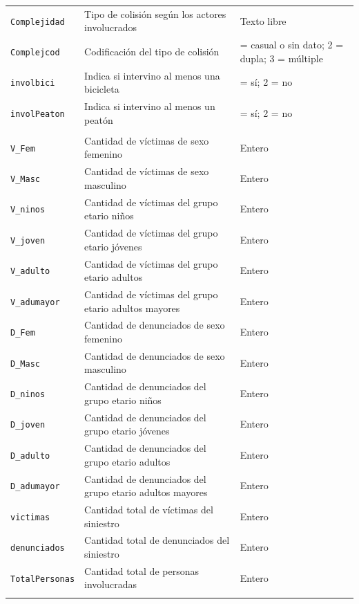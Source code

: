 \begin{longtable}{@{}>{\raggedright\arraybackslash}p{}
                    >{\raggedright\arraybackslash}p{}
                    >{\raggedright\arraybackslash}p{}@{}}
\texttt{Complejidad} & Tipo de colisión según los actores involucrados & Texto libre \\
\texttt{Complejcod} & Codificación del tipo de colisión & 1 = casual o sin dato; 2 = dupla; 3 = múltiple \\
\texttt{involbici} & Indica si intervino al menos una bicicleta & 1 = sí; 2 = no \\
\texttt{involPeaton} & Indica si intervino al menos un peatón & 1 = sí; 2 = no \\
\addlinespace

\multicolumn{3}{@{}l}{\textit{Personas involucradas}} \\
\addlinespace
\texttt{V\_Fem} & Cantidad de víctimas de sexo femenino & Entero \\
\texttt{V\_Masc} & Cantidad de víctimas de sexo masculino & Entero \\
\texttt{V\_ninos} & Cantidad de víctimas del grupo etario niños & Entero \\
\texttt{V\_joven} & Cantidad de víctimas del grupo etario jóvenes & Entero \\
\texttt{V\_adulto} & Cantidad de víctimas del grupo etario adultos & Entero \\
\texttt{V\_adumayor} & Cantidad de víctimas del grupo etario adultos mayores & Entero \\
\texttt{D\_Fem} & Cantidad de denunciados de sexo femenino & Entero \\
\texttt{D\_Masc} & Cantidad de denunciados de sexo masculino & Entero \\
\texttt{D\_ninos} & Cantidad de denunciados del grupo etario niños & Entero \\
\texttt{D\_joven} & Cantidad de denunciados del grupo etario jóvenes & Entero \\
\texttt{D\_adulto} & Cantidad de denunciados del grupo etario adultos & Entero \\
\texttt{D\_adumayor} & Cantidad de denunciados del grupo etario adultos mayores & Entero \\
\texttt{victimas} & Cantidad total de víctimas del siniestro & Entero \\
\texttt{denunciados} & Cantidad total de denunciados del siniestro & Entero \\
\texttt{TotalPersonas} & Cantidad total de personas involucradas & Entero \\
\addlinespace


\end{longtable}
